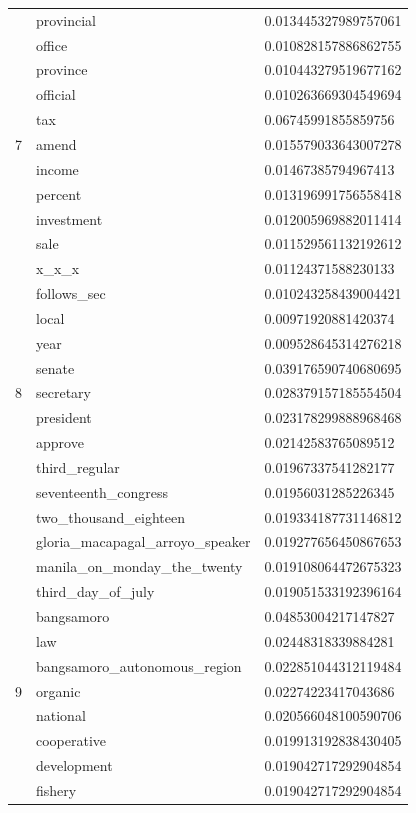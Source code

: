 \documentclass[conference]{IEEEtran}
\begin{document}
\begin{center}
\begin{longtable}{|l|l|l|}
& provincial & 0.013445327989757061 \\
& office & 0.010828157886862755 \\
& province & 0.010443279519677162 \\
& official & 0.010263669304549694 \\
\hline
\multirow{3}{4em}{7} & tax & 0.06745991855859756 \\
& amend & 0.015579033643007278 \\
& income & 0.01467385794967413 \\
& percent & 0.013196991756558418 \\
& investment & 0.012005969882011414 \\
& sale & 0.011529561132192612 \\
& x\_x\_x & 0.01124371588230133 \\
& follows\_sec & 0.010243258439004421 \\
& local & 0.00971920881420374 \\
& year & 0.009528645314276218 \\
\hline
\multirow{3}{4em}{8} & senate & 0.039176590740680695 \\
& secretary & 0.028379157185554504 \\
& president & 0.023178299888968468 \\
& approve & 0.02142583765089512 \\
& third\_regular & 0.01967337541282177 \\
& seventeenth\_congress & 0.01956031285226345 \\
& two\_thousand\_eighteen & 0.019334187731146812 \\
& gloria\_macapagal\_arroyo\_speaker & 0.019277656450867653 \\
& manila\_on\_monday\_the\_twenty & 0.019108064472675323 \\
& third\_day\_of\_july & 0.019051533192396164 \\
& bangsamoro & 0.04853004217147827 \\
& law & 0.02448318339884281 \\
\hline
\multirow{3}{4em}{9} & bangsamoro\_autonomous\_region & 0.022851044312119484 \\
& organic & 0.02274223417043686 \\
& national & 0.020566048100590706 \\
& cooperative & 0.019913192838430405 \\
& development & 0.019042717292904854 \\
& fishery & 0.019042717292904854 \\

\end{longtable}
\end{center}
\end{document}
